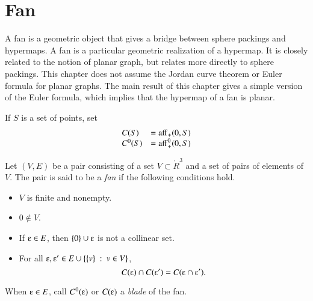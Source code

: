 
\chapter{Fan}\label{sec:fan}

A fan is a geometric object that gives a bridge between sphere packings and hypermaps.  A fan is a particular geometric realization of a hypermap.  It is closely related to the notion of planar graph, but relates more directly to sphere packings.  This chapter does not  assume the Jordan curve theorem or Euler formula for planar graphs.  The main result of this chapter gives a simple version of the Euler formula, 
which implies that the hypermap of a fan is planar.



If $S$ is a set of points,
set
  $$
  \begin{array}{lll}
  C(S) &= {\operatorname{aff}}_+(0,S)\\
  C^0(S) &= {\operatorname{aff}}^0_+(0,S)\\
  \end{array}
  $$

\begin{definition}[fan]  
Let $(V,E)$ be a pair consisting of a set $V\subset \ring{R}^3$ and a set of pairs of elements of $V$.  The pair is said to be
a {\it fan\/} if the following conditions hold.
    \begin{itemize}
    \item $V$ is finite and nonempty.
    \item $0\not\in V$.
    \item If $\e \in E$, then $\{0\}\cup \e$ is not a collinear set.
    \item 
    For all $\e ,\e '\in E \cup \{\{v\}\mid v\in V\}$, 
 $$C(\e )\cap C(\e ') = C(\e \cap \e ').$$
    \end{itemize}
When $\e\in E$, call $C^0(\e)$ or $C(\e)$ a {\it blade\/} of the fan.
\end{definition}

\bigskip\hbox{~}\bigskip


